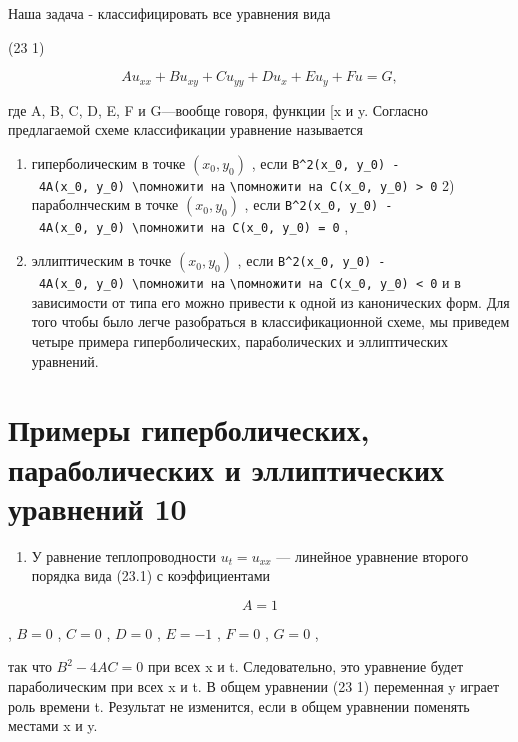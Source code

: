 \documentclass[
  ukrainian,
]{article}
\providecommand{\tightlist}{%
  \setlength{\itemsep}{0pt}\setlength{\parskip}{0pt}}
\begin{document}
Наша задача - классифицировать все уравнения вида

(23 1)

\[
Au_{xx} + Bu_{xy} + Cu_{yy} + Du_x + Eu_y + Fu = G,
\]

где A, B, C, D, E, F и G---вообще говоря, функции {[}x и y. Согласно
предлагаемой схеме классификации уравнение называется

\begin{enumerate}
\def\labelenumi{\arabic{enumi})}
\item
  гиперболическим в точке \((x_0, y_0)\) , если
  \texttt{B\^{}2(x\_0,\ y\_0)\ -\ 4A(x\_0,\ y\_0)\ \textbackslash{}помножити\ на}
  \texttt{\textbackslash{}помножити\ на\ C(x\_0,\ y\_0)\ \textgreater{}\ 0}
  2) параболнческим в точке \((x_0, y_0)\) , если
  \texttt{B\^{}2(x\_0,\ y\_0)\ -\ 4A(x\_0,\ y\_0)\ \textbackslash{}помножити\ на\ C(x\_0,\ y\_0)\ =\ 0}
  ,
\item
  эллиптическим в точке \((x_0, y_0)\) , если
  \texttt{B\^{}2(x\_0,\ y\_0)\ -\ 4A(x\_0,\ y\_0)\ \textbackslash{}помножити\ на}
  \texttt{\textbackslash{}помножити\ на\ C(x\_0,\ y\_0)\ \textless{}\ 0}
  и в зависимости от типа его можно привести к одной из канонических
  форм. Для того чтобы было легче разобраться в классификационной схеме,
  мы приведем четыре примера гиперболических, параболических и
  эллиптических уравнений.
\end{enumerate}

\section{Примеры гиперболических, параболических и эллиптических
уравнений
10}\label{ux43fux440ux438ux43cux435ux440ux44b-ux433ux438ux43fux435ux440ux431ux43eux43bux438ux447ux435ux441ux43aux438ux445-ux43fux430ux440ux430ux431ux43eux43bux438ux447ux435ux441ux43aux438ux445-ux438-ux44dux43bux43bux438ux43fux442ux438ux447ux435ux441ux43aux438ux445-ux443ux440ux430ux432ux43dux435ux43dux438ux439-10}

\begin{enumerate}
\def\labelenumi{\arabic{enumi}.}
\tightlist
\item
  У равнение теплопроводности \(u_t = u_{xx}\) --- линейное уравнение
  второго порядка вида (23.1) с коэффициентами
\end{enumerate}

\[
A=1
\]

, \(B=0\) , \(C=0\) , \(D=0\) , \(E=-1\) , \(F=0\) , \(G=0\) ,

так что \(B^2-4AC=0\) при всех x и t. Следовательно, это уравнение будет
параболическим при всех x и t. В общем уравнении (23 1) переменная y
играет роль времени t. Результат не изменится, если в общем уравнении
поменять местами x и y.
\end{document}
